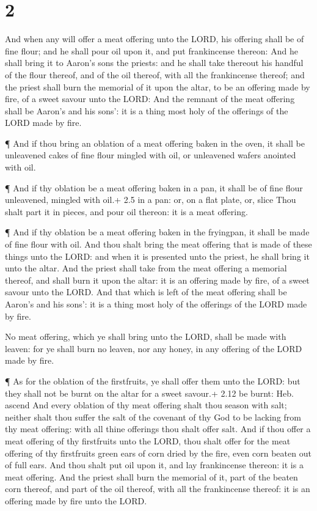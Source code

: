 \hypertarget{section-1}{%
\section{2}\label{section-1}}

 And when any will offer a meat offering unto the LORD, his
offering shall be of fine flour; and he shall pour oil upon it, and put
frankincense thereon:  And he shall bring it to Aaron's sons
the priests: and he shall take thereout his handful of the flour
thereof, and of the oil thereof, with all the frankincense thereof; and
the priest shall burn the memorial of it upon the altar, to be an
offering made by fire, of a sweet savour unto the LORD:  And
the remnant of the meat offering shall be Aaron's and his sons': it is a
thing most holy of the offerings of the LORD made by fire.

 ¶ And if thou bring an oblation of a meat offering baken in
the oven, it shall be unleavened cakes of fine flour mingled with oil,
or unleavened wafers anointed with oil.

 ¶ And if thy oblation be a meat offering baken in a pan, it
shall be of fine flour unleavened, mingled with oil.+ 2.5 in a pan: or,
on a flat plate, or, slice  Thou shalt part it in pieces,
and pour oil thereon: it is a meat offering.

 ¶ And if thy oblation be a meat offering baken in the
fryingpan, it shall be made of fine flour with oil.  And
thou shalt bring the meat offering that is made of these things unto the
LORD: and when it is presented unto the priest, he shall bring it unto
the altar.  And the priest shall take from the meat offering
a memorial thereof, and shall burn it upon the altar: it is an offering
made by fire, of a sweet savour unto the LORD.  And that
which is left of the meat offering shall be Aaron's and his sons': it is
a thing most holy of the offerings of the LORD made by fire.

 No meat offering, which ye shall bring unto the LORD,
shall be made with leaven: for ye shall burn no leaven, nor any honey,
in any offering of the LORD made by fire.

 ¶ As for the oblation of the firstfruits, ye shall offer
them unto the LORD: but they shall not be burnt on the altar for a sweet
savour.+ 2.12 be burnt: Heb. ascend  And every oblation of
thy meat offering shalt thou season with salt; neither shalt thou suffer
the salt of the covenant of thy God to be lacking from thy meat
offering: with all thine offerings thou shalt offer salt. 
And if thou offer a meat offering of thy firstfruits unto the LORD, thou
shalt offer for the meat offering of thy firstfruits green ears of corn
dried by the fire, even corn beaten out of full ears.  And
thou shalt put oil upon it, and lay frankincense thereon: it is a meat
offering.  And the priest shall burn the memorial of it,
part of the beaten corn thereof, and part of the oil thereof, with all
the frankincense thereof: it is an offering made by fire unto the LORD.

